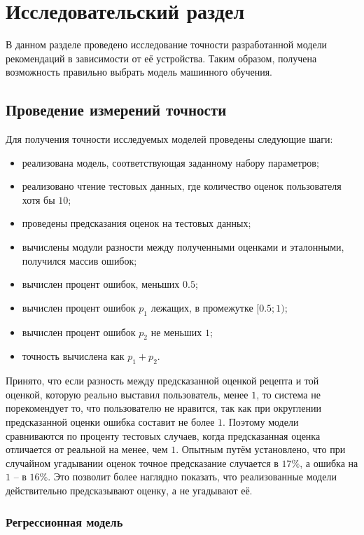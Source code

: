 \chapter{Исследовательский раздел}
В данном разделе проведено исследование точности разработанной модели рекомендаций в зависимости от её устройства.
Таким образом, получена возможность правильно выбрать модель машинного обучения.

\section{Проведение измерений точности}
Для получения точности исследуемых моделей проведены следующие шаги:
\begin{itemize}
	\item реализована модель, соответствующая заданному набору параметров;
	\item реализовано чтение тестовых данных, где количество оценок пользователя хотя бы $10$;
	\item проведены предсказания оценок на тестовых данных;
	\item вычислены модули разности между полученными оценками и эталонными, получился массив ошибок;
	\item вычислен процент ошибок, меньших $0{.}5$;
	\item вычислен процент ошибок $p_1$ лежащих, в промежутке $[0{.}5; 1)$;
	\item вычислен процент ошибок $p_2$ не меньших $1$;
	\item точность вычислена как $p_1 + p_2$.
\end{itemize}
Принято, что если разность между предсказанной оценкой рецепта и той оценкой, которую реально выставил пользователь, менее $1$, то система не порекомендует то, что пользователю не нравится, так как при округлении предсказанной оценки ошибка составит не более $1$.
Поэтому модели сравниваются по проценту тестовых случаев, когда предсказанная оценка отличается от реальной на менее, чем $1$.
Опытным путём установлено, что при случайном угадывании оценок точное предсказание случается в $17\%$, а ошибка на $1$ -- в $16\%$.
Это позволит более наглядно показать, что реализованные модели действительно предсказывают оценку, а не угадывают её.

\subsection{Регрессионная модель}
